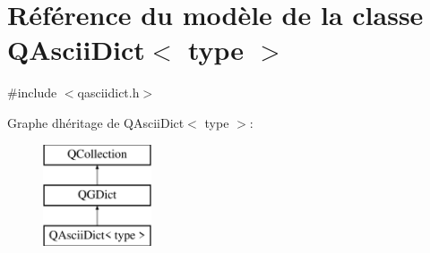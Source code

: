 \hypertarget{class_q_ascii_dict}{}\section{Référence du modèle de la classe Q\+Ascii\+Dict$<$ type $>$}
\label{class_q_ascii_dict}


{\ttfamily \#include $<$qasciidict.\+h$>$}

Graphe d\textquotesingle{}héritage de Q\+Ascii\+Dict$<$ type $>$\+:\begin{figure}[H]
\begin{center}
\leavevmode
\includegraphics[height=3.000000cm]{class_q_ascii_dict}
\end{center}
\end{figure}
